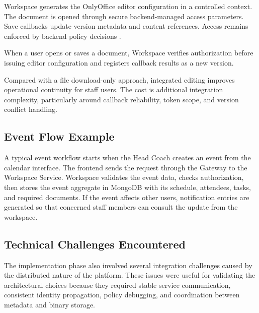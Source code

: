 Workspace generates the OnlyOffice editor configuration in a controlled context.
The document is opened through secure backend-managed access parameters. Save
callbacks update version metadata and content references. Access remains
enforced by backend policy decisions \cite{onlyoffice-doc}.

When a user opens or saves a document, Workspace verifies authorization before
issuing editor configuration and registers callback results as a new version.

Compared with a file download-only approach, integrated editing improves
operational continuity for staff users. The cost is additional integration
complexity, particularly around callback reliability, token scope, and version
conflict handling.

\subsection{Event Flow Example}

A typical event workflow starts when the Head Coach creates an event from the
calendar interface. The frontend sends the request through the Gateway to the
Workspace Service. Workspace validates the event data, checks authorization,
then stores the event aggregate in MongoDB with its schedule, attendees, tasks,
and required documents. If the event affects other users, notification entries
are generated so that concerned staff members can consult the update from the
workspace.

\subsection{Technical Challenges Encountered}

The implementation phase also involved several integration challenges caused by
the distributed nature of the platform. These issues were useful for validating
the architectural choices because they required stable service communication,
consistent identity propagation, policy debugging, and coordination between
metadata and binary storage.

